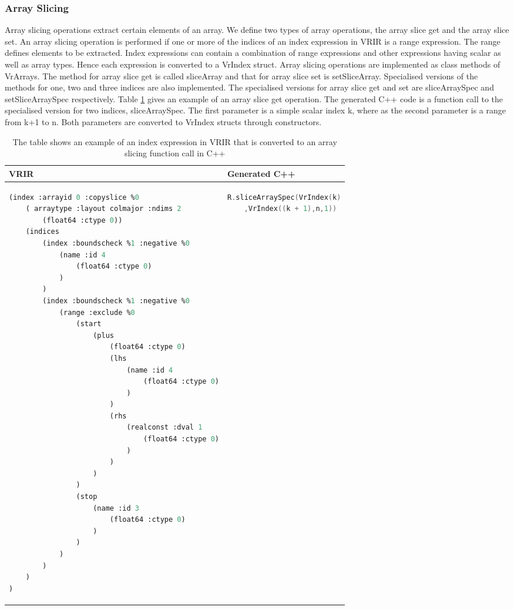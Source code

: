 \subsubsection{Array Slicing}
\label{subsubsec:slicing}
Array slicing operations extract certain elements of an array. We define two types of array operations, the array slice get and the array slice set. An array slicing operation is performed if one or more of the indices of an index expression in VRIR is a range expression. The range defines elements to be extracted. Index expressions can contain a combination of range expressions and other expressions having scalar as well as array types. Hence each expression is converted to a VrIndex struct. Array slicing operations are implemented as class methods of VrArrays. The method for array slice get is called sliceArray and that for array slice set is setSliceArray. Specialised versions of the methods for one, two and three indices are also implemented. The specialised versions for array slice get and set are sliceArraySpec and setSliceArraySpec respectively. Table \ref{tab:sliceIndex} gives an example of an array slice get operation. The generated C++ code is a function call to the specialised version for two indices, sliceArraySpec. The first parameter is a simple scalar index k, where as the second parameter is a range from k+1 to n. Both parameters are converted to VrIndex structs through constructors.
\begin{table}[htbp]
\centering
\begin{tabular}{|l|l|}
\hline

VRIR &  Generated C++ \\
\hline
{
\begin{lstlisting}[language=lisp,frame=none, numbers=none]
(index :arrayid 0 :copyslice %0
	( arraytype :layout colmajor :ndims 2
		(float64 :ctype 0))
	(indices
		(index :boundscheck %1 :negative %0
			(name :id 4
				(float64 :ctype 0)
			)
		)
		(index :boundscheck %1 :negative %0
			(range :exclude %0
				(start
					(plus
						(float64 :ctype 0)
						(lhs
							(name :id 4
								(float64 :ctype 0)
							)
						)
						(rhs
							(realconst :dval 1
								(float64 :ctype 0)
							)
						)
					)
				)
				(stop
					(name :id 3
						(float64 :ctype 0)
					)
				)
			)
		)
	)
)
\end{lstlisting}
}
&
{
\begin{lstlisting}[language=c,frame=none, numbers=none]
R.sliceArraySpec(VrIndex(k)
	,VrIndex((k + 1),n,1))
\end{lstlisting}
} \\
\hline
\end{tabular}
\caption[Array slicing example]{The table shows an example of an index expression in VRIR that is converted to an array slicing function call in C++}
\label{tab:sliceIndex}
\end{table}

